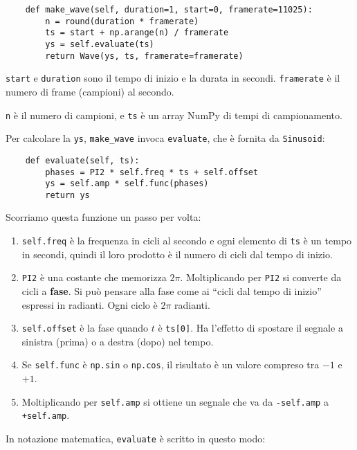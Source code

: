 \documentclass[12pt]{book} \usepackage[width=5.5in,height=8.5in, hmarginratio=3:2,vmarginratio=1:1]{geometry}
\begin{document}
\begin{verbatim} 
    def make_wave(self, duration=1, start=0, framerate=11025):
        n = round(duration * framerate)
        ts = start + np.arange(n) / framerate
        ys = self.evaluate(ts)
        return Wave(ys, ts, framerate=framerate)
 \end{verbatim} 

{\tt start} e {\tt duration} sono il tempo di inizio e la durata in secondi. {\tt framerate} è il numero di frame (campioni) al secondo.

{\tt n} è il numero di campioni, e {\tt ts} è un array NumPy di tempi di campionamento.

Per calcolare la {\tt ys}, \verb"make_wave" invoca {\tt evaluate}, che è fornita da {\tt Sinusoid}:

\begin{verbatim} 
    def evaluate(self, ts):
        phases = PI2 * self.freq * ts + self.offset
        ys = self.amp * self.func(phases)
        return ys
 \end{verbatim} 

Scorriamo questa funzione un passo per volta:

\begin{enumerate} 

\item {\tt self.freq} è la frequenza in cicli al secondo e ogni elemento di {\tt ts} è un tempo in secondi, quindi il loro prodotto è il numero di cicli dal tempo di inizio.

\item {\tt PI2} è una costante che memorizza $2 \pi$. Moltiplicando per {\tt PI2} si converte da cicli a {\bf fase}. Si può pensare alla fase come ai ``cicli dal tempo di inizio'' espressi in radianti. Ogni ciclo è $2 \pi$ radianti.

\item {\tt self.offset} è la fase quando $t$ è {\tt ts[0]}. Ha l'effetto di spostare il segnale a sinistra (prima) o a destra (dopo) nel tempo.

\item Se {\tt self.func} è {\tt np.sin} o {\tt np.cos}, il risultato è un valore compreso tra $-1$ e $+1$.

\item Moltiplicando per {\tt self.amp} si ottiene un segnale che va da {\tt -self.amp} a {\tt +self.amp}.

\end{enumerate} 

In notazione matematica, {\tt evaluate} è scritto in questo modo:
\end{document}
